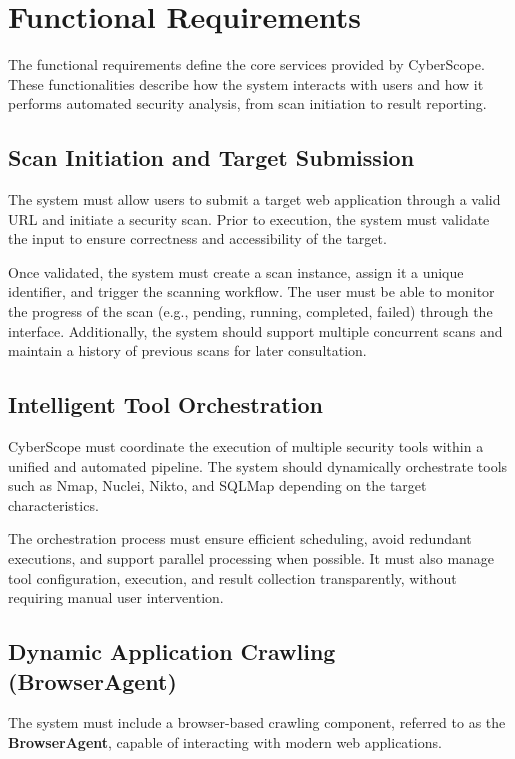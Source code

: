 \section{Functional Requirements}

\indent\justifying The functional requirements define the core services provided by CyberScope. These functionalities describe how the system interacts with users and how it performs automated security analysis, from scan initiation to result reporting.

\subsection{Scan Initiation and Target Submission}

\indent The system must allow users to submit a target web application through a valid URL and initiate a security scan. Prior to execution, the system must validate the input to ensure correctness and accessibility of the target.

\indent Once validated, the system must create a scan instance, assign it a unique identifier, and trigger the scanning workflow. The user must be able to monitor the progress of the scan (e.g., pending, running, completed, failed) through the interface. Additionally, the system should support multiple concurrent scans and maintain a history of previous scans for later consultation.

\subsection{Intelligent Tool Orchestration}

\indent CyberScope must coordinate the execution of multiple security tools within a unified and automated pipeline. The system should dynamically orchestrate tools such as Nmap, Nuclei, Nikto, and SQLMap depending on the target characteristics.

\indent The orchestration process must ensure efficient scheduling, avoid redundant executions, and support parallel processing when possible. It must also manage tool configuration, execution, and result collection transparently, without requiring manual user intervention.

\subsection{Dynamic Application Crawling (BrowserAgent)}

\indent The system must include a browser-based crawling component, referred to as the \textbf{BrowserAgent}, capable of interacting with modern web applications.


